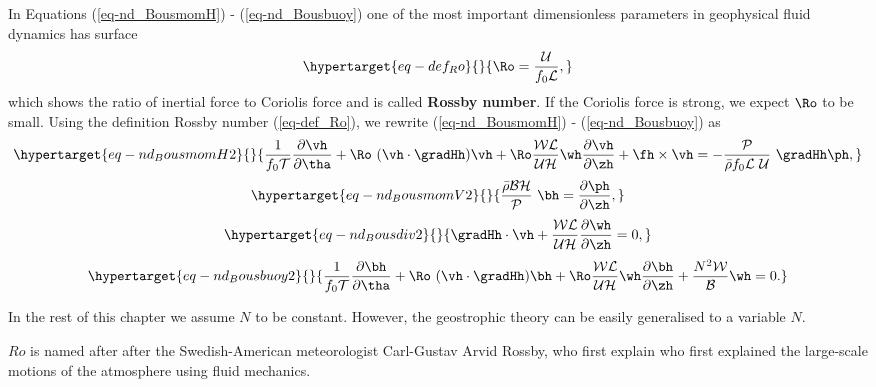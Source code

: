 \documentclass[
  letterpaper,
  twocolumn,
  landscape]{report}
\begin{document}
In Equations (\ref{eq-nd_BousmomH}) - (\ref{eq-nd_Bousbuoy}) one of the
most important dimensionless parameters in geophysical fluid dynamics
has surface \begin{equation}\protect\hypertarget{eq-def_Ro}{}{
     \Ro = \frac{\mathcal{U}}{f_0 \mathcal{L}},
}\label{eq-def_Ro}\end{equation} which shows the ratio of inertial force
to Coriolis force and is called \textbf{Rossby number}. If the Coriolis
force is strong, we expect \(\Ro\) to be small. Using the definition
Rossby number (\ref{eq-def_Ro}), we rewrite (\ref{eq-nd_BousmomH}) -
(\ref{eq-nd_Bousbuoy}) as
\begin{equation}\protect\hypertarget{eq-nd_BousmomH2}{}{ \frac{1}{f_0 \mathcal{T}} \frac{\partial\vh}{\partial \tha} + \Ro \ (\vh \cdot \gradHh ) \vh + \Ro \frac{\mathcal{W} \mathcal{L}}{\mathcal{U} \mathcal{H}} \wh \frac{\partial \vh }{\partial \zh} + \fh \times \vh = - \frac{\mathcal{P}}{\bar\rho f_0 \mathcal{L}\ \mathcal{U} } \ \gradHh \ph, }\label{eq-nd_BousmomH2}\end{equation}
\begin{equation}\protect\hypertarget{eq-nd_BousmomV2}{}{ \frac{\bar\rho \mathcal{B} \mathcal{H}}{\mathcal{P}} \ \bh = \frac{\partial \ph }{\partial \zh} , }\label{eq-nd_BousmomV2}\end{equation}
\begin{equation}\protect\hypertarget{eq-nd_Bousdiv2}{}{ \gradHh \cdot\vh + \frac{\mathcal{W} \mathcal{L}}{\mathcal{U} \mathcal{H}}  \frac{\partial \wh}{\partial \zh} =0,}\label{eq-nd_Bousdiv2}\end{equation}
\begin{equation}\protect\hypertarget{eq-nd_Bousbuoy2}{}{ \frac{1}{f_0 \mathcal{T}} \frac{\partial \bh}{\partial \tha} +\Ro \ (\vh\cdot\gradHh ) \bh + \Ro \frac{\mathcal{W} \mathcal{L}}{\mathcal{U} \mathcal{H}} \wh \frac{\partial \bh}{\partial \zh} + \frac{N^2 \mathcal{W}}{\mathcal{B}} \wh =0. }\label{eq-nd_Bousbuoy2}\end{equation}

In the rest of this chapter we assume \(N\) to be constant. However, the
geostrophic theory can be easily generalised to a variable \(N\).

\begin{tcolorbox}[enhanced jigsaw, toprule=.15mm, left=2mm, opacityback=0, breakable, arc=.35mm, colback=white, rightrule=.15mm, bottomrule=.15mm, colframe=quarto-callout-note-color-frame, leftrule=.75mm]
\begin{minipage}[t]{5.5mm}
\textcolor{quarto-callout-note-color}{\faInfo}
\end{minipage}%
\begin{minipage}[t]{\textwidth - 5.5mm}

\(Ro\) is named after after the Swedish-American meteorologist
Carl-Gustav Arvid Rossby, who first explain who first explained the
large-scale motions of the atmosphere using fluid mechanics.

\end{minipage}%
\end{tcolorbox}
\end{document}
